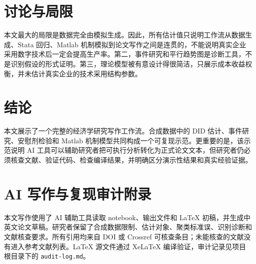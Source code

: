 \documentclass[11pt]{ctexart}
\begin{document}
\section{讨论与局限}

本文最大的局限是数据完全由模拟生成。因此，所有估计值只说明工作流从数据生成、Stata 回归、Matlab 机制模拟到论文写作之间是连贯的，不能说明真实企业采用数字技术后一定会提高生产率。第二，事件研究和平行趋势图是诊断工具，不是识别假设的形式证明。第三，理论模型被有意设计得很简洁，只展示成本收益权衡，并未估计真实企业的技术采用结构参数。

\section{结论}

本文展示了一个完整的经济学研究写作工作流。合成数据中的 DID 估计、事件研究、安慰剂检验和 Matlab 机制模型共同构成一个可复现示范。更重要的是，该示范说明 AI 工具可以辅助研究者把可执行分析转化为正式论文文本，但研究者仍必须核查文献、验证代码、检查编译结果，并明确区分演示性结果和真实经验证据。

\section{AI 写作与复现审计附录}

本文写作使用了 AI 辅助工具读取 notebook、输出文件和 LaTeX 初稿，并生成中英文论文草稿。研究者保留了合成数据限制、估计对象、聚类标准误、识别诊断和文献核查要求。所有引用均来自 DOI 或 Crossref 可核查条目；未能核查的文献没有进入参考文献列表。LaTeX 源文件通过 XeLaTeX 编译验证，审计记录见项目根目录下的 \texttt{audit-log.md}。



\end{document}
